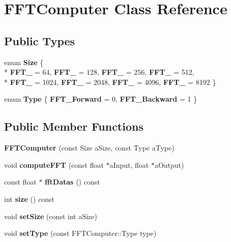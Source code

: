 \hypertarget{class_f_f_t_computer}{\section{F\-F\-T\-Computer Class Reference}
\label{class_f_f_t_computer}
}
\subsection*{Public Types}
\begin{DoxyCompactItemize}
\item 
enum {\bfseries Size} \{ \\*
{\bfseries F\-F\-T\-\_} = 64, 
{\bfseries F\-F\-T\-\_} = 128, 
{\bfseries F\-F\-T\-\_} = 256, 
{\bfseries F\-F\-T\-\_} = 512, 
\\*
{\bfseries F\-F\-T\-\_} = 1024, 
{\bfseries F\-F\-T\-\_} = 2048, 
{\bfseries F\-F\-T\-\_} = 4096, 
{\bfseries F\-F\-T\-\_} = 8192
 \}
\item 
enum {\bfseries Type} \{ {\bfseries F\-F\-T\-\_\-\-Forward} = 0, 
{\bfseries F\-F\-T\-\_\-\-Backward} = 1
 \}
\end{DoxyCompactItemize}
\subsection*{Public Member Functions}
\begin{DoxyCompactItemize}
\item 
\hypertarget{class_f_f_t_computer_a49c459731262fbbc3edd3dc436ee44be}{{\bfseries F\-F\-T\-Computer} (const Size a\-Size, const Type a\-Type)}\label{class_f_f_t_computer_a49c459731262fbbc3edd3dc436ee44be}

\item 
\hypertarget{class_f_f_t_computer_a9c7a9bad443e296b971e103481ee94f0}{void {\bfseries compute\-F\-F\-T} (const float $\ast$a\-Input, float $\ast$a\-Output)}\label{class_f_f_t_computer_a9c7a9bad443e296b971e103481ee94f0}

\item 
\hypertarget{class_f_f_t_computer_a2bf6c665927f54a75d5d32090741478a}{const float $\ast$ {\bfseries fft\-Datas} () const }\label{class_f_f_t_computer_a2bf6c665927f54a75d5d32090741478a}

\item 
\hypertarget{class_f_f_t_computer_abcf7facb480a6cabcd2b5679e74c078f}{int {\bfseries size} () const }\label{class_f_f_t_computer_abcf7facb480a6cabcd2b5679e74c078f}

\item 
\hypertarget{class_f_f_t_computer_aff161aefddfba585a7299834dafecfd1}{void {\bfseries set\-Size} (const int a\-Size)}\label{class_f_f_t_computer_aff161aefddfba585a7299834dafecfd1}

\item 
\hypertarget{class_f_f_t_computer_a81b687b4fd28b924b3dec95119f3729c}{void {\bfseries set\-Type} (const F\-F\-T\-Computer\-::\-Type type)}\label{class_f_f_t_computer_a81b687b4fd28b924b3dec95119f3729c}

\end{DoxyCompactItemize}


